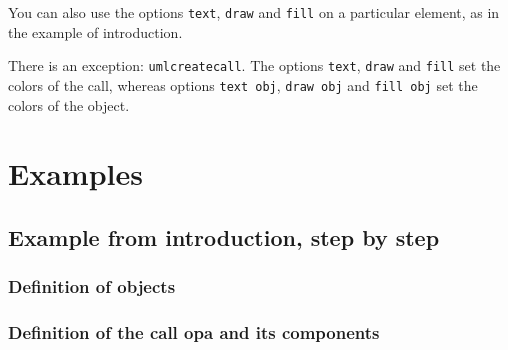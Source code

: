 \documentclass[a4paper,11pt]{report}
\begin{document}
You can also use the options {\tt text}, {\tt draw} and {\tt fill} on a particular element, as in the example of introduction.

There is an exception: {\tt umlcreatecall}. The options {\tt text}, {\tt draw} and {\tt fill} set the colors of the call, whereas options {\tt text obj}, {\tt draw obj} and {\tt fill obj} set the colors of the object.

\medskip

\begin{minipage}{0.6\textwidth}

\end{minipage}
\begin{minipage}{0.4\textwidth}
\begin{center}
\end{center}
\end{minipage}

\section{Examples}

\subsection{Example from introduction, step by step}

\subsubsection{Definition of objects}

{\color{red!70!black}
\vspace{-0.4cm}

}

\begin{center}
\end{center}

\subsubsection{Definition of the call opa and its components}

\vspace{-0.4cm}
{\color{red!70!black}
\vspace{-0.4cm}
\vspace{-0.4cm}
\vspace{-0.4cm}
\vspace{-0.4cm}
\vspace{-0.4cm}
}

\end{document}
